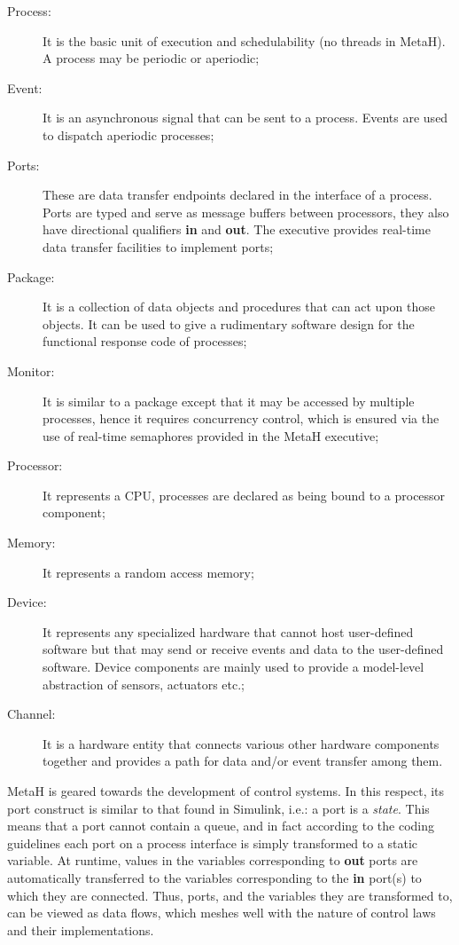 \begin{description}
\item[Process:]{It is the basic unit of execution and schedulability
  (no threads in MetaH). A process may be periodic or aperiodic;}
\item[Event:]{It is an asynchronous signal that can be sent to a
  process. Events are used to dispatch aperiodic processes;}
\item[Ports:]{These are data transfer endpoints declared in the
  interface of a process. Ports are typed and serve as message buffers
  between processors, they also have directional qualifiers
  \textbf{in} and \textbf{out}. The executive provides real-time data
  transfer facilities to implement ports;}
\item[Package:]{It is a collection of data objects and procedures that
  can act upon those objects. It can be used to give a rudimentary
  software design for the functional response code of processes;}
\item[Monitor:]{It is similar to a package except that it may be
  accessed by multiple processes, hence it requires concurrency
  control, which is ensured via the use of real-time semaphores
  provided in the MetaH executive;}
\item[Processor:]{It represents a CPU, processes are declared as being
  bound to a processor component;}
\item[Memory:]{It represents a random access memory;}
\item[Device:]{It represents any specialized hardware that cannot host
  user-defined software but that may send or receive events and data
  to the user-defined software. Device components are mainly used to
  provide a model-level abstraction of sensors, actuators etc.;}
\item[Channel:]{It is a hardware entity that connects various other
  hardware components together and provides a path for data and/or
  event transfer among them.}
\end{description}

MetaH is geared towards the development of control systems. In this
respect, its port construct is similar to that found in Simulink,
i.e.: a port is a \emph{state}. This means that a port cannot contain
a queue, and in fact according to the coding guidelines each port on a
process interface is simply transformed to a static variable. At
runtime, values in the variables corresponding to \textbf{out} ports
are automatically transferred to the variables corresponding to the
\textbf{in} port(s) to which they are connected. Thus, ports, and the
variables they are transformed to, can be viewed as data flows, which
meshes well with the nature of control laws and their implementations.

